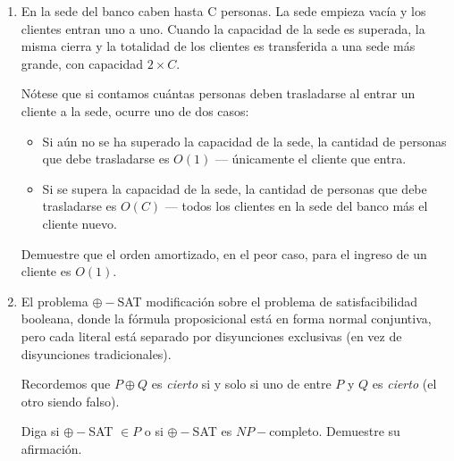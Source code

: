 \documentclass[letterpaper, 12pt]{article}
\begin{document}
\begin{enumerate}
\item  En la sede del banco caben hasta C personas. La sede empieza vacía y los
clientes entran uno a uno. Cuando la capacidad de la sede es superada, la misma cierra y la totalidad de los clientes es transferida a una sede más grande, con capacidad $2 \times C$.

Nótese que si contamos cuántas personas deben trasladarse al entrar un cliente a la sede, ocurre uno de dos casos:

\begin{itemize}
    \item Si aún no se ha superado la capacidad de la sede, la cantidad de personas que debe trasladarse es $O(1)$ — únicamente el cliente que entra.
    \item Si se supera la capacidad de la sede, la cantidad de personas que debe trasladarse es $O(C)$ — todos los clientes en la sede del banco más el cliente nuevo.
\end{itemize}

Demuestre que el orden amortizado, en el peor caso, para el ingreso de un cliente es $O(1)$. \\

\item El problema $\oplus-$SAT modificación sobre el problema de satisfacibilidad booleana, donde la fórmula proposicional está en forma normal conjuntiva, pero cada literal está separado por disyunciones exclusivas (en vez de disyunciones tradicionales).

Recordemos que $P \oplus Q$ es \emph{cierto} si y solo si uno de entre $P$ y $Q$ es \emph{cierto} (el otro siendo falso).

Diga si $\oplus-$SAT $\in P$ o si $\oplus-$SAT es $NP-$completo. Demuestre su afirmación. \\


\end{enumerate}
\end{document}

